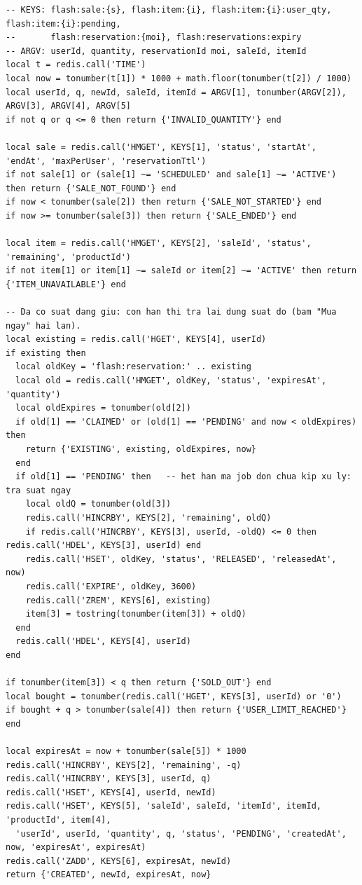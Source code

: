 \reportblockspace{72pt}
\begin{lstlisting}[language={[5.3]Lua}, caption={reserve.lua: kiểm tra và trừ suất trong một script (Try)}, label={lst:cc-reserve}]
-- KEYS: flash:sale:{s}, flash:item:{i}, flash:item:{i}:user_qty, flash:item:{i}:pending,
--       flash:reservation:{moi}, flash:reservations:expiry
-- ARGV: userId, quantity, reservationId moi, saleId, itemId
local t = redis.call('TIME')
local now = tonumber(t[1]) * 1000 + math.floor(tonumber(t[2]) / 1000)
local userId, q, newId, saleId, itemId = ARGV[1], tonumber(ARGV[2]), ARGV[3], ARGV[4], ARGV[5]
if not q or q <= 0 then return {'INVALID_QUANTITY'} end

local sale = redis.call('HMGET', KEYS[1], 'status', 'startAt', 'endAt', 'maxPerUser', 'reservationTtl')
if not sale[1] or (sale[1] ~= 'SCHEDULED' and sale[1] ~= 'ACTIVE') then return {'SALE_NOT_FOUND'} end
if now < tonumber(sale[2]) then return {'SALE_NOT_STARTED'} end
if now >= tonumber(sale[3]) then return {'SALE_ENDED'} end

local item = redis.call('HMGET', KEYS[2], 'saleId', 'status', 'remaining', 'productId')
if not item[1] or item[1] ~= saleId or item[2] ~= 'ACTIVE' then return {'ITEM_UNAVAILABLE'} end

-- Da co suat dang giu: con han thi tra lai dung suat do (bam "Mua ngay" hai lan).
local existing = redis.call('HGET', KEYS[4], userId)
if existing then
  local oldKey = 'flash:reservation:' .. existing
  local old = redis.call('HMGET', oldKey, 'status', 'expiresAt', 'quantity')
  local oldExpires = tonumber(old[2])
  if old[1] == 'CLAIMED' or (old[1] == 'PENDING' and now < oldExpires) then
    return {'EXISTING', existing, oldExpires, now}
  end
  if old[1] == 'PENDING' then   -- het han ma job don chua kip xu ly: tra suat ngay
    local oldQ = tonumber(old[3])
    redis.call('HINCRBY', KEYS[2], 'remaining', oldQ)
    if redis.call('HINCRBY', KEYS[3], userId, -oldQ) <= 0 then redis.call('HDEL', KEYS[3], userId) end
    redis.call('HSET', oldKey, 'status', 'RELEASED', 'releasedAt', now)
    redis.call('EXPIRE', oldKey, 3600)
    redis.call('ZREM', KEYS[6], existing)
    item[3] = tostring(tonumber(item[3]) + oldQ)
  end
  redis.call('HDEL', KEYS[4], userId)
end

if tonumber(item[3]) < q then return {'SOLD_OUT'} end
local bought = tonumber(redis.call('HGET', KEYS[3], userId) or '0')
if bought + q > tonumber(sale[4]) then return {'USER_LIMIT_REACHED'} end

local expiresAt = now + tonumber(sale[5]) * 1000
redis.call('HINCRBY', KEYS[2], 'remaining', -q)
redis.call('HINCRBY', KEYS[3], userId, q)
redis.call('HSET', KEYS[4], userId, newId)
redis.call('HSET', KEYS[5], 'saleId', saleId, 'itemId', itemId, 'productId', item[4],
  'userId', userId, 'quantity', q, 'status', 'PENDING', 'createdAt', now, 'expiresAt', expiresAt)
redis.call('ZADD', KEYS[6], expiresAt, newId)
return {'CREATED', newId, expiresAt, now}
\end{lstlisting}

